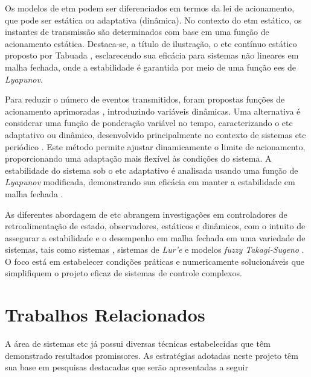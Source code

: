 
Os modelos de \acrshort{etm} podem ser diferenciados em termos da lei de acionamento, que pode ser estática ou adaptativa (dinâmica). No contexto do \acrshort{etm} estático, os instantes de transmissão são determinados com base em uma função de acionamento estática. Destaca-se, a título de ilustração, o \acrshort{etc} contínuo estático proposto por Tabuada \cite{Tabuada2007}, esclarecendo sua eficácia para sistemas não lineares em malha fechada, onde a estabilidade é garantida por meio de uma função \acrfull{ees} de \textit{Lyapunov}.

Para reduzir o número de eventos transmitidos, foram propostas funções de acionamento aprimoradas \cite{Wang2020,Zong2023,Ge2017, Ning2018, Wu2021}, introduzindo variáveis dinâmicas. Uma alternativa é considerar uma função de ponderação variável no tempo, caracterizando o \acrshort{etc} adaptativo ou dinâmico, desenvolvido principalmente no contexto de sistemas \acrshort{etc} periódico \cite{coutinho2021}. Este método permite ajustar dinamicamente o limite de acionamento, proporcionando uma adaptação mais flexível às condições do sistema. A estabilidade do sistema sob o \acrshort{etc} adaptativo é analisada usando uma função de \textit{Lyapunov} modificada, demonstrando sua eficácia em manter a estabilidade em malha fechada \cite{coutinho2021}.

As diferentes abordagem de \acrshort{etc} abrangem investigações em controladores de retroalimentação de estado, observadores,  estáticos e dinâmicos, com o intuito de assegurar a estabilidade e o desempenho em malha fechada em uma variedade de sistemas, tais como sistemas  \cite{Zong2023,Wu2021}, sistemas de \textit{Lur'e} \cite{Zhang2017} e modelos \textit{fuzzy Takagi-Sugeno} \cite{Pan2017}. O foco está em estabelecer condições práticas e numericamente solucionáveis que simplifiquem o projeto eficaz de sistemas de controle complexos.

\section{Trabalhos Relacionados}

A área de sistemas \acrshort{etc} já possui diversas técnicas estabelecidas que têm demonstrado resultados promissores. As estratégias adotadas neste projeto têm sua base em pesquisas destacadas que serão apresentadas a seguir

